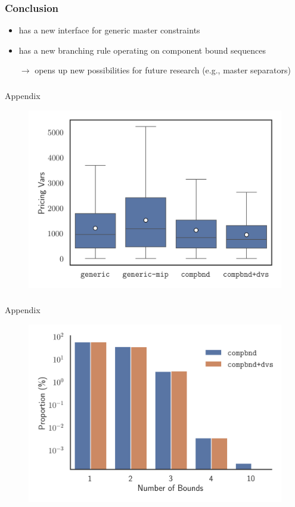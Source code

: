 \documentclass[compress,beamer,aspectratio=169,english,usenames,dvipsnames]{beamer}
\begin{document}
\begin{frame}
\frametitle{Conclusion}

\begin{itemize}
\item	\GCG{} has a {\color{orange} new interface} for generic master constraints
\item	\GCG{} has a {\color{orange} new branching rule} operating on component bound sequences
\item[$\rightarrow$]	opens up new possibilities for future research (e.g., master separators)
\end{itemize}
\end{frame}

\appendix

\begin{frame}
\frametitle{}
\huge Appendix
\centering
\begin{figure}
\includegraphics[height=0.85\textheight]{graphics/slides/general/MostFractional/pricing_vars.png}
\end{figure}
\end{frame}

\begin{frame}
\frametitle{}
\huge Appendix
\centering
\begin{figure}
\includegraphics[height=0.85\textheight]{graphics/slides/bound_stats/num_bounds.png}
\end{figure}
\end{frame}
\end{document}

